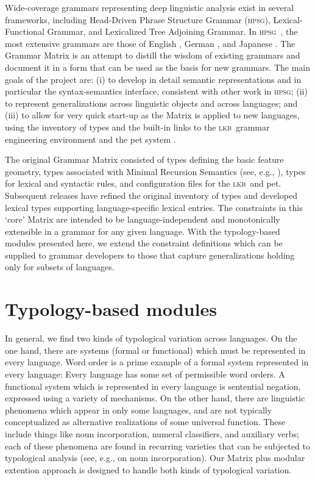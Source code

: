 \documentclass[11pt]{article}
\newcommand{\hpsg}{\textsc{hpsg}}
\newcommand{\lkb}{\textsc{lkb}}
\begin{document}
Wide-coverage grammars representing deep linguistic analysis exist in
several frameworks, including Head-Driven Phrase Structure Grammar
(\hpsg), Lexical-Functional Grammar, and Lexicalized Tree Adjoining
Grammar.  In \hpsg\ \cite{Pol:Sag:94}, the most extensive grammars are
those of English \cite{Flickinger:00}, German
\cite{Hinrichs:etal:97,Mue:Kap:00,Crysmannip}, and Japanese
\cite{Siegel:00,Siegel:Bender:02}.  The Grammar Matrix is an attempt
to distill the wisdom of existing grammars and document it in a form
that can be used as the basis for new grammars. The main goals of the
project are: (i) to develop in detail semantic representations and in
particular the syntax-semantics interface, consistent with other work
in \hpsg; (ii) to represent generalizations across linguistic objects
and across languages; and (iii) to allow for very quick start-up as
the Matrix is applied to new languages, using the inventory of types
and the built-in links to the \lkb\ grammar engineering environment
\cite{Copestake:02} and the {\sc pet} system \cite{Callmeier:00}.

The original Grammar Matrix consisted of types defining
the basic feature geometry, types associated with Minimal Recursion
Semantics (see, e.g., \cite{Cop:Las:Fli:01}), types for lexical and
syntactic rules, and configuration files for the \lkb\
and {\sc pet}.  Subsequent releases have refined the original
inventory of types and developed lexical types 
supporting language-specific lexical entries.  The constraints in this
`core' Matrix are intended to be language-independent and
monotonically extensible in a grammar for any given language.
With the typology-based modules presented here, we extend the
constraint definitions which can be supplied to grammar developers to
those that capture generalizations holding only for subsets of
languages.

\section{Typology-based modules}

In general, we find two kinds of typological variation across
languages.  On the one hand, there are systems (formal or functional)
which must be represented in every language.  Word order is a prime
example of a formal system represented in every language: Every
language has some set of permissible word orders.
A functional system which is represented in every language is
sentential negation, expressed using a variety of mechanisms.  On 
the other hand, there are linguistic
phenomena which appear in only some languages, and are not typically
conceptualized as alternative realizations of some universal function.  
These include things like
noun incorporation, numeral classifiers, and auxiliary verbs; each of
these phenomena are found in recurring varieties that can be 
subjected to typological
analysis (see, e.g., \cite{Mithun:84} on noun incorporation).
Our Matrix plus modular extention approach is designed 
to handle both kinds of typological variation.
\end{document}

